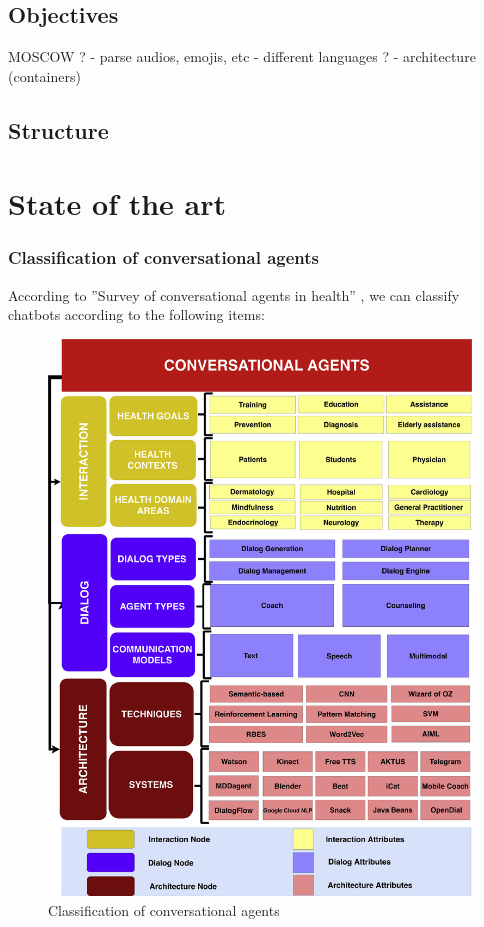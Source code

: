\documentclass[12pt,english]{article}
\begin{document}
\subsection{Objectives}

MOSCOW ?
- parse audios, emojis, etc
- different languages ?
- architecture (containers)

\subsection{Structure}

\newpage
\section{State of the art}

\subsubsection{Classification of conversational agents}

According to ''Survey of conversational agents in health'' \cite{a7}, we can classify chatbots according to the following items:

\begin{figure}[H]
  \centering
  \includegraphics{taxonomy.jpg}
  \caption{Classification of conversational agents}
\end{figure}
\end{document}
